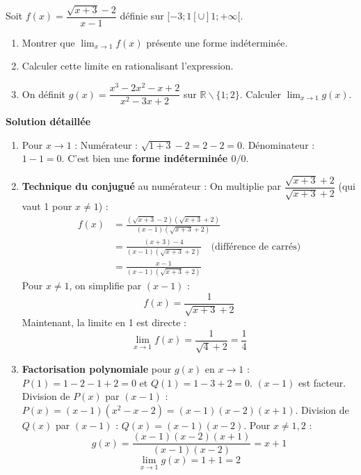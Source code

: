 \documentclass[11pt]{article}
\def\setminus{\mathbin{\backslash}}\let\smallsetminus\setminus
\begin{document}
\begin{exoresolu}
    Soit $f(x) = \dfrac{\sqrt{x+3} - 2}{x-1}$ définie sur $[-3; 1[ \cup ]1; +\infty[$.
    \begin{enumerate}
        \item Montrer que $\lim_{x\to 1} f(x)$ présente une forme indéterminée.
        \item Calculer cette limite en rationalisant l'expression.
        \item On définit $g(x) = \dfrac{x^3 - 2x^2 - x + 2}{x^2 - 3x + 2}$ sur $\mathbb{R}\setminus\{1;2\}$. Calculer $\lim_{x\to 1} g(x)$.
    \end{enumerate}
    \tcblower
    \textbf{Solution détaillée}
    \begin{enumerate}
        \item Pour $x\to 1$ :
              Numérateur : $\sqrt{1+3} - 2 = 2 - 2 = 0$.
              Dénominateur : $1 - 1 = 0$.
              C'est bien une \textbf{forme indéterminée $0/0$}.
        \item \textbf{Technique du conjugué} au numérateur :
              On multiplie par $\dfrac{\sqrt{x+3} + 2}{\sqrt{x+3} + 2}$ (qui vaut 1 pour $x \neq 1$) :
              \begin{align*}
                  f(x) &= \frac{(\sqrt{x+3} - 2)(\sqrt{x+3} + 2)}{(x-1)(\sqrt{x+3} + 2)} \\
                  &= \frac{(x+3) - 4}{(x-1)(\sqrt{x+3} + 2)} \quad \text{(différence de carrés)} \\
                  &= \frac{x - 1}{(x-1)(\sqrt{x+3} + 2)}
              \end{align*}
              Pour $x \neq 1$, on simplifie par $(x-1)$ :
              \[ f(x) = \frac{1}{\sqrt{x+3} + 2} \]
              Maintenant, la limite en 1 est directe :
              \[ \lim_{x\to 1} f(x) = \frac{1}{\sqrt{4} + 2} = \frac{1}{4} \]
        \item \textbf{Factorisation polynomiale} pour $g(x)$ en $x\to 1$ :
              $P(1) = 1 - 2 - 1 + 2 = 0$ et $Q(1) = 1 - 3 + 2 = 0$. $(x-1)$ est facteur.
              Division de $P(x)$ par $(x-1)$ : $P(x) = (x-1)(x^2 - x - 2) = (x-1)(x-2)(x+1)$.
              Division de $Q(x)$ par $(x-1)$ : $Q(x) = (x-1)(x-2)$.
              Pour $x \neq 1, 2$ :
              \[ g(x) = \frac{(x-1)(x-2)(x+1)}{(x-1)(x-2)} = x+1 \]
              \[ \lim_{x\to 1} g(x) = 1 + 1 = 2 \]
    \end{enumerate}
\end{exoresolu}
\end{document}
